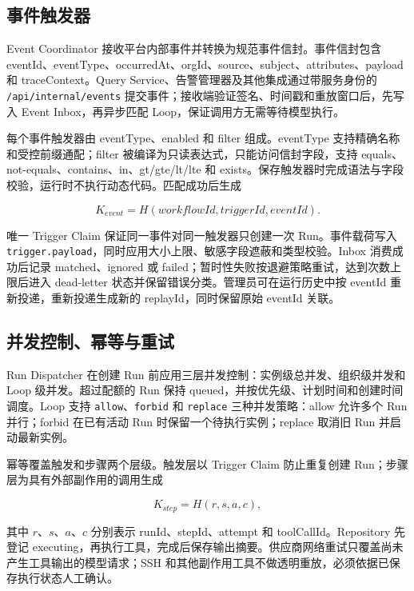 \documentclass[conference,10pt]{IEEEtran}
\newcommand{\code}[1]{\texttt{#1}}
\begin{document}
\subsection{事件触发器}

Event Coordinator 接收平台内部事件并转换为规范事件信封。事件信封包含 eventId、eventType、occurredAt、orgId、source、subject、attributes、payload 和 traceContext。Query Service、告警管理器及其他集成通过带服务身份的 \code{/api/internal/events} 提交事件；接收端验证签名、时间戳和重放窗口后，先写入 Event Inbox，再异步匹配 Loop，保证调用方无需等待模型执行。

每个事件触发器由 eventType、enabled 和 filter 组成。eventType 支持精确名称和受控前缀通配；filter 被编译为只读表达式，只能访问信封字段，支持 equals、not-equals、contains、in、gt/gte/lt/lte 和 exists。保存触发器时完成语法与字段校验，运行时不执行动态代码。匹配成功后生成

\begin{equation}
 K_{event}=H(workflowId,triggerId,eventId).
\end{equation}

唯一 Trigger Claim 保证同一事件对同一触发器只创建一次 Run。事件载荷写入 \code{trigger.payload}，同时应用大小上限、敏感字段遮蔽和类型校验。Inbox 消费成功后记录 matched、ignored 或 failed；暂时性失败按退避策略重试，达到次数上限后进入 dead-letter 状态并保留错误分类。管理员可在运行历史中按 eventId 重新投递，重新投递生成新的 replayId，同时保留原始 eventId 关联。

\subsection{并发控制、幂等与重试}

Run Dispatcher 在创建 Run 前应用三层并发控制：实例级总并发、组织级并发和 Loop 级并发。超过配额的 Run 保持 queued，并按优先级、计划时间和创建时间调度。Loop 支持 \code{allow}、\code{forbid} 和 \code{replace} 三种并发策略：allow 允许多个 Run 并行；forbid 在已有活动 Run 时保留一个待执行实例；replace 取消旧 Run 并启动最新实例。

幂等覆盖触发和步骤两个层级。触发层以 Trigger Claim 防止重复创建 Run；步骤层为具有外部副作用的调用生成

\begin{equation}
 K_{step}=H(r,s,a,c),
\end{equation}

其中 $r$、$s$、$a$、$c$ 分别表示 runId、stepId、attempt 和 toolCallId。Repository 先登记 executing，再执行工具，完成后保存输出摘要。供应商网络重试只覆盖尚未产生工具输出的模型请求；SSH 和其他副作用工具不做透明重放，必须依据已保存执行状态人工确认。
\end{document}
